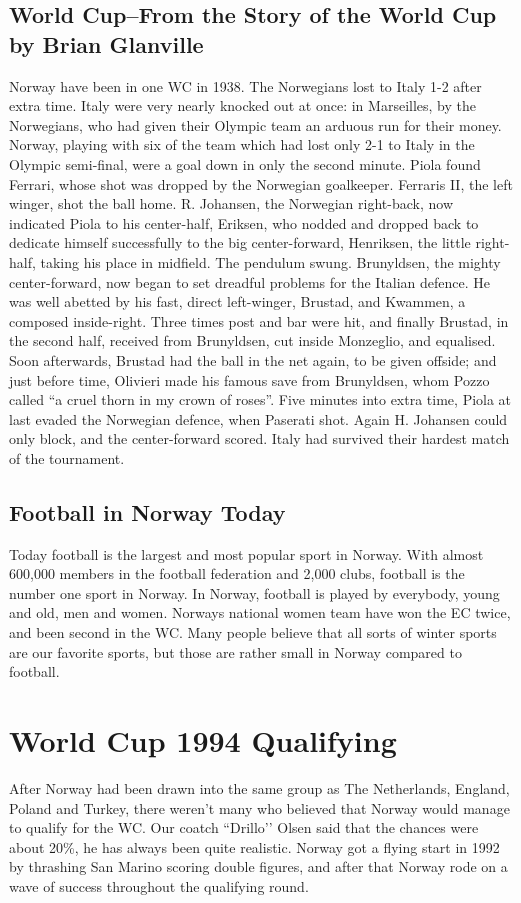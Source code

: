 \subsection{World Cup--From the Story of the World Cup by Brian Glanville}
Norway have been in one WC in 1938.  The Norwegians lost to Italy 1-2 after extra time.
Italy were very nearly knocked out at once: in Marseilles, by the Norwegians, 
who had given their Olympic team an arduous run for their money. Norway, 
playing with six of the team which had lost only 2-1 to Italy in the Olympic 
semi-final, were a goal down in only the second minute. Piola found Ferrari, 
whose shot was dropped by the Norwegian goalkeeper. Ferraris II, the left 
winger, shot the ball home. R. Johansen, the Norwegian right-back, now
indicated Piola to his center-half, Eriksen, who nodded and dropped back to
dedicate himself successfully to the big center-forward, Henriksen, the little
right-half, taking his place in midfield. The pendulum swung. Brunyldsen, the 
mighty center-forward, now began to set dreadful problems for the Italian 
defence. He was well abetted by his fast, direct left-winger, Brustad, and 
Kwammen, a composed inside-right. Three times post and bar were hit, and 
finally Brustad, in the second half, received from Brunyldsen, cut inside 
Monzeglio, and equalised. Soon afterwards, Brustad had the ball in the
net again, to be given offside; and just before time, Olivieri made his famous
save from Brunyldsen, whom Pozzo called ``a cruel thorn in my crown of roses''.
Five minutes into extra time, Piola at last evaded the Norwegian defence,
when Paserati shot. Again H. Johansen could only block, and the center-forward
scored. Italy had survived their hardest match of the tournament.
\subsection{Football in Norway Today}
Today football is the largest and most popular sport in Norway. With almost
600,000 members in the football federation and 2,000 clubs, football is the 
number one sport in Norway. In Norway, football is played by everybody, young 
and old, men and women. Norways national women team have won the EC twice, and 
been second in the WC. Many people believe that all sorts of winter sports are 
our favorite sports, but those are rather small in Norway compared to football.
\section{World Cup 1994 Qualifying}
After Norway had been drawn into the same group as The Netherlands, England,
Poland and Turkey, there weren't many who believed that Norway would manage to
qualify for the WC. Our coatch ``Drillo’’ Olsen said that the chances were about 
20\%, he has always been quite realistic. Norway got a flying start in 1992 by 
thrashing San Marino scoring double figures, and after that Norway rode on a 
wave of success throughout the qualifying round.

